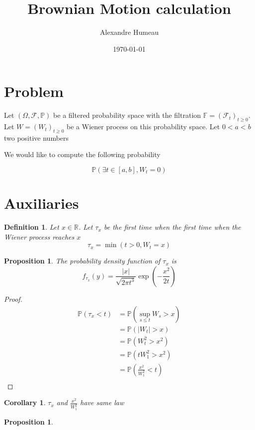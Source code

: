 \documentclass{article}
\newtheorem{corollary}[theorem]{Corollary}
\newtheorem{proposition}[theorem]{Proposition}
\newtheorem{definition}{Definition}[section]
\begin{document}
\title{Brownian Motion calculation}
\author{Alexandre Humeau}
\date{\today}
\maketitle

\section{Problem}

Let $\left(\Omega, \mathcal{F}, \mathbb{P}\right)$ be a filtered probability space with the filtration $\mathbb{F} = \left(\mathcal{F}_t\right)_{t \geq 0}$. Let $W = (W_t)_{t \geq 0}$ be a Wiener process on this probability space. Let $0 < a < b$ two positive numbers

We would like to compute the following probability

\begin{equation}
	\mathbb{P}\left(\exists t \in \left[a,b\right], W_t = 0\right)
\end{equation}

\section{Auxiliaries}

\begin{definition}
	Let $x \in \mathbb{R}$. Let $\tau_x$ be the first time when the first time when the Wiener process reaches $x$
	\begin{equation}
		\tau_x = \min\left(t > 0, W_t = x\right)
	\end{equation}
\end{definition}

\begin{proposition}
	The probability density function of $\tau_x$ is 
	\begin{equation}
		f_{\tau_x} (y) = \frac{\left|x\right|}{\sqrt{2 \pi t^3}} \exp\left(-\frac{x^2}{2t}\right)
	\end{equation}
\end{proposition}

\begin{proof}
	\begin{equation*}
	\begin{aligned}
		\mathbb{P}\left(\tau_x < t\right) &= \mathbb{P}\left(\sup_{s \leq t} W_s > x\right)\\
		&= \mathbb{P}\left(\left|W_t\right| > x\right)\\
		&= \mathbb{P}\left(W_t^2 > x^2\right)\\
		&= \mathbb{P}\left(t W_1^2 > x^2\right)\\
		&= \mathbb{P}\left(\frac{x^2}{W_1^2} < t\right)\\
	\end{aligned}
	\end{equation*}
\end{proof}

\begin{corollary}
	$\tau_x$ and $\frac{x^2}{W_1^2}$ have same law
\end{corollary}

\begin{proposition}
\end{proposition}
\end{document}
